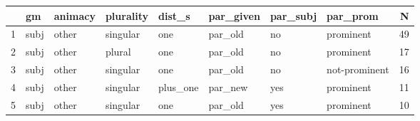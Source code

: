 \begin{table}[ht]
	\centering
	\begin{tabular}{rlllllllr}
		\hline
		& gm & animacy & plurality & dist\_s & par\_given & par\_subj & par\_prom & N \\ 
		\hline
		1 & subj & other & singular & one & par\_old & no & prominent &  49 \\ 
		2 & subj & other & plural & one & par\_old & no & prominent &  17 \\ 
		3 & subj & other & singular & one & par\_old & no & not-prominent &  16 \\ 
		4 & subj & other & singular & plus\_one & par\_new & yes & prominent &  11 \\ 
		5 & subj & other & singular & one & par\_old & yes & prominent &  10 \\ 
		\hline
	\end{tabular}
\end{table}